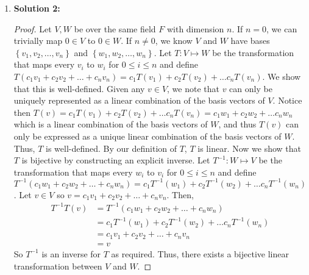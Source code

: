 \documentclass[letterpaper,12pt]{article}
\newcommand{\set}[1]{\left\{ #1 \right\}}
\theoremstyle{definition}
\begin{document}
\begin{enumerate}
    \item[]
    
    \begin{mdframed}
            \textbf{Solution 2:  }
            \begin{proof}
             Let $V,W$ be over the same field $F$ with dimension $n$. If $n = 0$, we can trivially map $0 \in V$ to $0 \in W$. If $n\neq 0$, we know $V$ and $W$ have bases $\set{v_1,v_2,\ldots,v_n}$ and $\set{w_1,w_2,\ldots,w_n}$. Let $T:V \mapsto W$ be the transformation that maps every $v_i$ to $w_i$ for $0 \leq i \leq n$ and define $T(c_1v_1 + c_2v_2 + \ldots + c_nv_n) = c_1T(v_1) + c_2T(v_2) + \ldots c_nT(v_n)$. We show that this is well-defined. Given any $v \in V$, we note that $v$ can only be uniquely represented as a linear combination of the basis vectors of $V$. Notice then $T(v) =  c_1T(v_1) + c_2T(v_2) + \ldots c_nT(v_n) = c_1w_1 + c_2w_2 + \ldots c_nw_n$ which is a linear combination of the basis vectors of $W$, and thus $T(v)$ can only be expressed as a unique linear combination of the basis vectors of $W$. Thus, $T$ is well-defined. By our definition of $T$, $T$ is linear. Now we show that $T$ is bijective by constructing an explicit inverse. Let $T^{-1} : W \mapsto V$  be the transformation that maps every $w_i$ to $v_i$ for $0 \leq i \leq n$ and define $T^{-1}(c_1w_1 + c_2w_2 + \ldots + c_nw_n) = c_1T^{-1}(w_1) + c_2T^{-1}(w_2) + \ldots c_nT^{-1}(w_n)$. Let $v \in V$ so $v = c_1v_1 + c_2v_2 + \ldots + c_nv_n$. Then, \begin{align*}
                 T^{-1}T(v) &= T^{-1}(c_1w_1 + c_2w_2 + \ldots + c_nw_n) \\
                 &= c_1T^{-1}(w_1) + c_2T^{-1}(w_2) + \ldots c_nT^{-1}(w_n) \\
                 &= c_1v_1 + c_2v_2 + \ldots + c_nv_n \\
                 &= v
             \end{align*}
             So $T^{-1}$ is an inverse for $T$ as required. Thus, there exists a bijective linear transformation between $V$ and $W$.
             \end{proof}
             \end{mdframed}
             \end{enumerate}
\pagebreak
\end{document}
